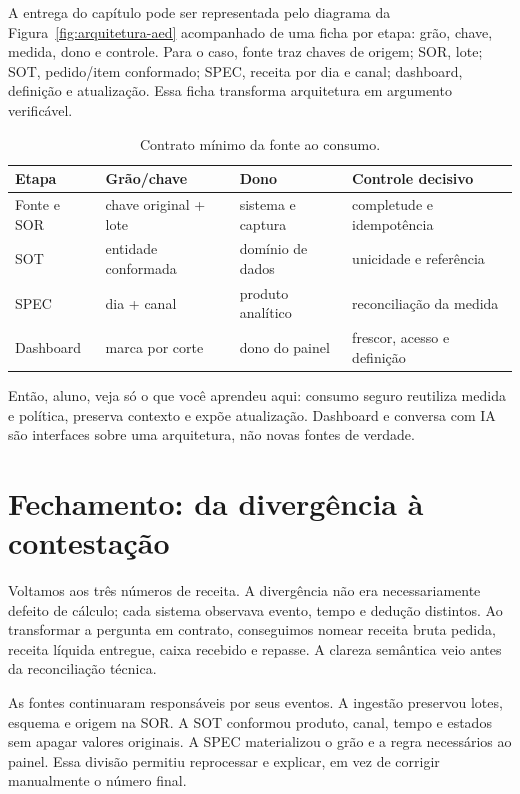 A entrega do capítulo pode ser representada pelo diagrama da Figura~\ref{fig:arquitetura-aed} acompanhado de uma ficha por etapa: grão, chave, medida, dono e controle. Para o caso, fonte traz chaves de origem; SOR, lote; SOT, pedido/item conformado; SPEC, receita por dia e canal; dashboard, definição e atualização. Essa ficha transforma arquitetura em argumento verificável.

\begin{table}[htbp]
\centering
\small
\caption{Contrato mínimo da fonte ao consumo.}
\label{tab:contrato-ponta-a-ponta}
\begin{tabularx}{0.96\textwidth}{@{}p{2.2cm}p{2.3cm}p{2.3cm}Y@{}}
\toprule
\textbf{Etapa} & \textbf{Grão/chave} & \textbf{Dono} & \textbf{Controle decisivo} \\
\midrule
Fonte e SOR & chave original + lote & sistema e captura & completude e idempotência \\
SOT & entidade conformada & domínio de dados & unicidade e referência \\
SPEC & dia + canal & produto analítico & reconciliação da medida \\
Dashboard & marca por corte & dono do painel & frescor, acesso e definição \\
\bottomrule
\end{tabularx}
\end{table}

\begin{SummaryBox}
Então, aluno, veja só o que você aprendeu aqui: consumo seguro reutiliza medida e política, preserva contexto e expõe atualização. Dashboard e conversa com IA são interfaces sobre uma arquitetura, não novas fontes de verdade.
\end{SummaryBox}

\section{Fechamento: da divergência à contestação}

Voltamos aos três números de receita. A divergência não era necessariamente defeito de cálculo; cada sistema observava evento, tempo e dedução distintos. Ao transformar a pergunta em contrato, conseguimos nomear receita bruta pedida, receita líquida entregue, caixa recebido e repasse. A clareza semântica veio antes da reconciliação técnica.

As fontes continuaram responsáveis por seus eventos. A ingestão preservou lotes, esquema e origem na SOR. A SOT conformou produto, canal, tempo e estados sem apagar valores originais. A SPEC materializou o grão e a regra necessários ao painel. Essa divisão permitiu reprocessar e explicar, em vez de corrigir manualmente o número final.

